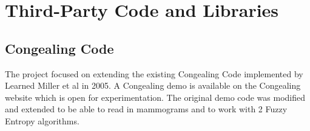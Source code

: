\chapter{Third-Party Code and Libraries}






\section{Congealing Code}

The project focused on extending the existing Congealing Code implemented by Learned Miller et al in 2005. A Congealing demo is available on the Congealing website \cite{Learned-Miller} which is open for experimentation. The original demo code was modified and extended to be able to read in mammograms and to work with 2 Fuzzy Entropy algorithms.
